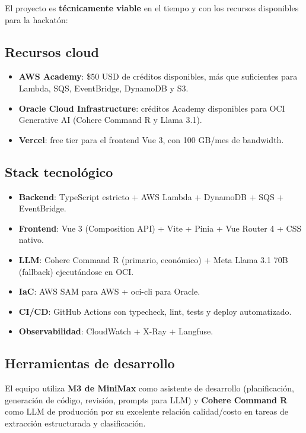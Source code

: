 \documentclass[11pt,a4paper]{article}
\begin{document}
El proyecto es \textbf{t\'ecnicamente viable} en el tiempo y con los recursos disponibles para la hackat\'on:

\subsection{Recursos cloud}
\begin{itemize}[leftmargin=*]
    \item \textbf{AWS Academy}: \$50 USD de cr\'editos disponibles, m\'as que suficientes para Lambda, SQS, EventBridge, DynamoDB y S3.
    \item \textbf{Oracle Cloud Infrastructure}: cr\'editos Academy disponibles para OCI Generative AI (Cohere Command R y Llama 3.1).
    \item \textbf{Vercel}: free tier para el frontend Vue 3, con 100 GB/mes de bandwidth.
\end{itemize}

\subsection{Stack tecnol\'ogico}

\begin{itemize}[leftmargin=*]
    \item \textbf{Backend}: TypeScript estricto + AWS Lambda + DynamoDB + SQS + EventBridge.
    \item \textbf{Frontend}: Vue 3 (Composition API) + Vite + Pinia + Vue Router 4 + CSS nativo.
    \item \textbf{LLM}: Cohere Command R (primario, econ\'omico) + Meta Llama 3.1 70B (fallback) ejecut\'andose en OCI.
    \item \textbf{IaC}: AWS SAM para AWS + oci-cli para Oracle.
    \item \textbf{CI/CD}: GitHub Actions con typecheck, lint, tests y deploy automatizado.
    \item \textbf{Observabilidad}: CloudWatch + X-Ray + Langfuse.
\end{itemize}

\subsection{Herramientas de desarrollo}

El equipo utiliza \textbf{M3 de MiniMax} como asistente de desarrollo (planificaci\'on, generaci\'on de c\'odigo, revisi\'on, prompts para LLM) y \textbf{Cohere Command R} como LLM de producci\'on por su excelente relaci\'on calidad/costo en tareas de extracci\'on estructurada y clasificaci\'on.
\end{document}
